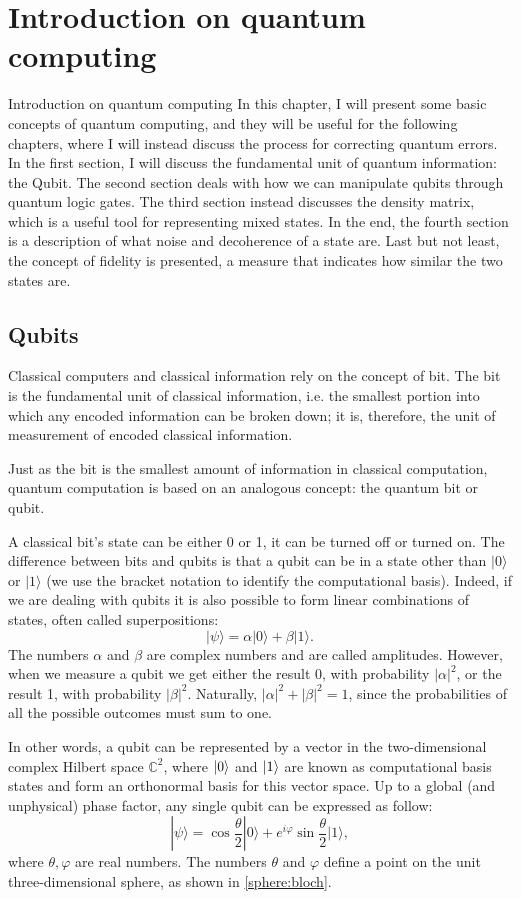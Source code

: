 \chapter{Introduction on quantum computing}

Introduction on quantum computing
In this chapter, I will present some basic concepts of quantum computing, and they will be useful for the following chapters, where I will instead discuss the process for correcting quantum errors. In the first section, I will discuss the fundamental unit of quantum information: the Qubit. The second section deals with how we can manipulate qubits through quantum logic gates. The third section instead discusses the density matrix, which is a useful tool for representing mixed states. In the end, the fourth section is a description of what noise and decoherence of a state are. Last but not least, the concept of fidelity is presented, a measure that indicates how similar the two states are.


\section{Qubits}
Classical computers and classical information rely on the concept of bit. The bit is the fundamental unit of classical information, i.e. the smallest portion into which any encoded information can be broken down; it is, therefore, the unit of measurement of encoded classical information.

Just as the bit is the smallest amount of information in classical computation, quantum computation is based on an analogous concept: the quantum bit or qubit.

A classical bit's state can be either 0 or 1, it can be turned off or turned on. The difference between bits and qubits is that a qubit can be in a state other than $|0\rangle$ or $|1\rangle$ (we use the bracket notation to identify the computational basis).
Indeed, if we are dealing with qubits it is also possible to form linear combinations of states, often called superpositions:
$$
|\psi\rangle=\alpha|0\rangle+\beta|1\rangle .
$$
The numbers $\alpha$ and $\beta$ are complex numbers and are called amplitudes.
However, when we measure a qubit we get either the result 0, with probability $|\alpha|^{2}$, or the result 1, with probability $|\beta|^{2}$. Naturally, $|\alpha|^{2}+|\beta|^{2}=1$, since the probabilities of all the possible outcomes must sum to one. 

In other words, a qubit can be represented by a vector in the two-dimensional complex Hilbert space $\mathbb{C}^2$, where $\ket{0}$ and $\ket{1}$ are known as computational basis states and form an orthonormal basis for this vector space.
Up to a global (and unphysical) phase factor, any single qubit can be expressed as follow: 
$$
|\psi\rangle=\cos \frac{\theta}{2}|0\rangle+e^{i \varphi} \sin \frac{\theta}{2}|1\rangle ,
$$
where $\theta, \varphi$ are real numbers. 
The numbers $\theta$ and $\varphi$ define a point on the unit three-dimensional sphere, as shown in \ref{sphere:bloch}.

